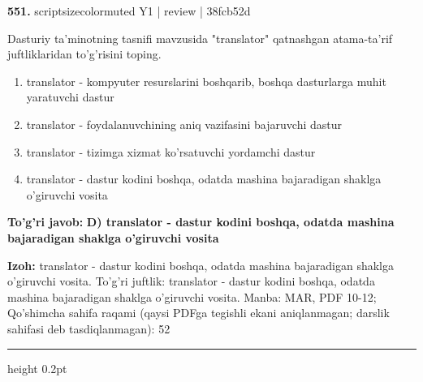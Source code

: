\documentclass[10pt,a4paper]{article}
\begin{document}
{\bfseries\sffamily\color{ink} 551.} {scriptsizecolor{muted} Y1 | review | 38fcb52d}
\par
Dasturiy ta'minotning tasnifi mavzusida "translator" qatnashgan atama-ta'rif juftliklaridan to'g'risini toping.
\begin{enumerate}[label=\Alph*),leftmargin=9mm]
\item translator - kompyuter resurslarini boshqarib, boshqa dasturlarga muhit yaratuvchi dastur
\item translator - foydalanuvchining aniq vazifasini bajaruvchi dastur
\item translator - tizimga xizmat ko'rsatuvchi yordamchi dastur
\item translator - dastur kodini boshqa, odatda mashina bajaradigan shaklga o'giruvchi vosita
\end{enumerate}
\begin{tcolorbox}[enhanced,breakable,colback=teal!4,colframe=teal!60!black,boxrule=0.45pt,arc=1.2mm,left=2.7mm,right=2.7mm,top=1.8mm,bottom=1.8mm,before skip=2mm,after skip=2mm]
{\bfseries\sffamily\color{teal}To'g'ri javob:} \textbf{D) translator - dastur kodini boshqa, odatda mashina bajaradigan shaklga o'giruvchi vosita}
\par\smallskip
{\bfseries Izoh:} translator - dastur kodini boshqa, odatda mashina bajaradigan shaklga o'giruvchi vosita. To'g'ri juftlik: translator - dastur kodini boshqa, odatda mashina bajaradigan shaklga o'giruvchi vosita. Manba: MAR, PDF 10-12; Qo'shimcha sahifa raqami (qaysi PDFga tegishli ekani aniqlanmagan; darslik sahifasi deb tasdiqlanmagan): 52
\end{tcolorbox}
\vspace{2mm}\hrule height 0.2pt\vspace{3mm}
\end{document}
